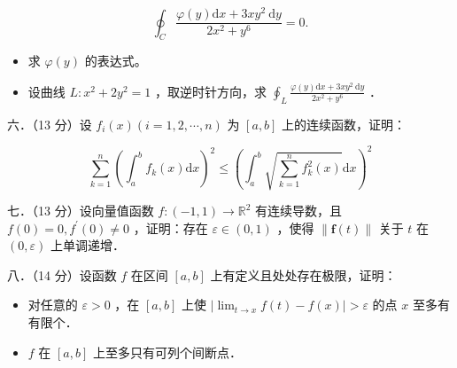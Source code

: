 \documentclass{article}
\begin{document}
\[
\oint_{C} \frac{\varphi(y) \mathrm{d} x+3 x y^{2} \mathrm{~d} y}{2 x^{2}+y^{6}}=0 .
\]

\begin{itemize}
  \item[（1）] 求 \(\varphi(y)\) 的表达式。
  \item[（2）] 设曲线 \(L: x^{2}+2 y^{2}=1\) ，取逆时针方向，求 \(\oint_{L} \frac{\varphi(y) \mathrm{d} x+3 x y^{2} \mathrm{~d} y}{2 x^{2}+y^{6}}\) ．
\end{itemize}

六．（13 分）设 \(f_{i}(x)(i=1,2, \cdots, n)\) 为 \([a, b]\) 上的连续函数，证明：

\[
\sum_{k=1}^{n}\left(\int_{a}^{b} f_{k}(x) \mathrm{d} x\right)^{2} \leq\left(\int_{a}^{b} \sqrt{\sum_{k=1}^{n} f_{k}^{2}(x)} \mathrm{d} x\right)^{2}
\]

七．（13 分）设向量值函数 \(f:(-1,1) \rightarrow \mathbb{R}^{2}\) 有连续导数，且 \(f(0)=0, f^{\prime}(0) \neq 0\) ，证明：存在 \(\varepsilon \in(0,1)\) ，使得 \(\|\mathbf{f}(t)\|\) 关于 \(t\) 在 \((0, \varepsilon)\) 上单调递增．

八．（14 分）设函数 \(f\) 在区间 \([a, b]\) 上有定义且处处存在极限，证明：

\begin{itemize}
  \item[（1）] 对任意的 \(\varepsilon>0\) ，在 \([a, b]\) 上使 \(\left|\lim _{t \rightarrow x} f(t)-f(x)\right|>\varepsilon\) 的点 \(x\) 至多有有限个．
  \item[（2）] \(f\) 在 \([a, b]\) 上至多只有可列个间断点．
\end{itemize}
\end{document}
